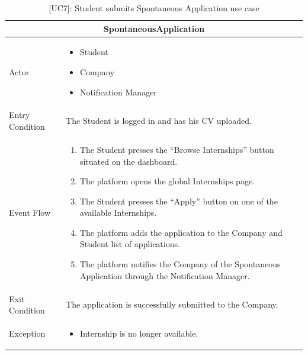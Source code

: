 \begin{table}[H]
    \centering
    \begin{tabular}{|p{3cm}|p{12cm}|}
    \hline
    \multicolumn{2}{|c|}{\textbf{SpontaneousApplication}} \\ \hline
    Actor & 
    \begin{itemize}
        \item Student
        \item Company
        \item Notification Manager
    \end{itemize}\\ \hline
    Entry Condition & The Student is logged in and has his CV uploaded. \\ \hline
    Event Flow &
    \begin{enumerate}         
        \item The Student presses the “Browse Internships” button situated on the dashboard.
        \item The platform opens the global Internships page.
        \item The Student presses the “Apply” button on one of the available Internships.
        \item The platform adds the application to the Company and Student list of applications.
        \item The platform notifies the Company of the Spontaneous Application through the Notification Manager.
    \end{enumerate} \\ \hline
    Exit Condition & The application is successfully submitted to the Company.\\ \hline
    Exception & 
    \begin{itemize}       
        \item Internship is no longer available.
    \end{itemize} \\ \hline
    \end{tabular}
    \caption{[UC7]: Student submits Spontaneous Application use case}
    \label{tab:UC7}
\end{table}

